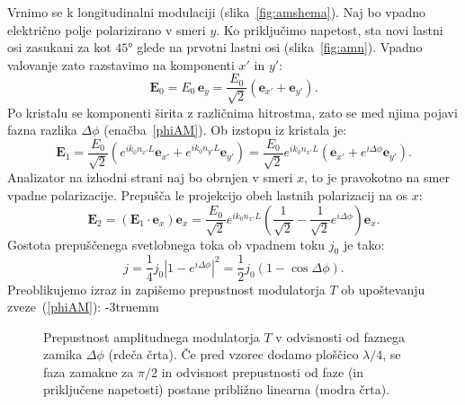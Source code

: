 Vrnimo se k longitudinalni
modulaciji (slika~\ref{fig:amshema}).
Naj bo vpadno električno polje polarizirano v smeri $y$. 
Ko priključimo napetost, sta novi lastni osi zasukani 
za kot $45\si{\degree}$ glede na prvotni lastni osi (slika~\ref{fig:amn}). Vpadno 
valovanje zato razstavimo na komponenti $x'$ in $y'$:
\begin{equation}
\mathbf{E}_0 = E_0\, \mathbf{e}_y = \frac{E_0}{\sqrt{2}}\left(\mathbf{e}_{x'} + \mathbf{e}_{y'}\right)\!\!.
\end{equation}
Po kristalu se komponenti širita z različnima hitrostma, zato se med njima pojavi 
fazna razlika $\Delta \phi$ 
(enačba~\ref{phiAM}). Ob izstopu iz kristala je:
\begin{equation}
\mathbf{E}_1 = \frac{E_0}{\sqrt{2}}\left(e^{ik_0 n_{x'}L}\mathbf{e}_{x'} + 
e^{ik_0 n_{y'}L}\mathbf{e}_{y'}\right)
= \frac{E_0}{\sqrt{2}}e^{ik_0 n_{x'}L}\left(\mathbf{e}_{x'} + 
e^{i\Delta\phi}\mathbf{e}_{y'}\right)\!\!.
\end{equation}
Analizator na izhodni strani naj bo obrnjen v smeri $x$, to je pravokotno
na smer vpadne polarizacije. Prepušča le projekcijo obeh lastnih polarizacij
na os $x$:
\begin{equation}
\mathbf{E}_2= \left(\mathbf{E}_1 \cdot \mathbf{e}_x\right)\mathbf{e}_x = 
\frac{E_0}{\sqrt{2}}e^{ik_0 n_{x'}L}
\left(\frac{1}{\sqrt{2}} -\frac{1}{\sqrt{2}} e^{i\Delta\phi}\right)\mathbf{e}_x .
\label{7.16}
\end{equation}
Gostota prepuščenega svetlobnega toka ob vpadnem toku $j_0$ je tako:
\begin{equation}
j=\frac{1}{4}j_{0}\left|1-e^{i\Delta\phi}\right|^{2}=\frac{1}{2}j_{0}(1-\cos\Delta\phi).
\label{7.17}
\end{equation}
Preoblikujemo izraz in zapišemo prepustnost modulatorja $T$ ob upoštevanju 
zveze~(\ref{phiAM}):
\vglue-3truemm
\begin{figure}[ht]
\centering
\def\svgwidth{65truemm} 

\caption{Prepustnost amplitudnega modulatorja $T$ v 
odvisnosti od faznega zamika $\Delta \phi$ (rdeča črta). 
Če pred vzorec dodamo ploščico $\lambda/4$, 
se faza zamakne za $\pi/2$ in odvisnost prepustnosti od faze (in priključene 
napetosti) postane približno linearna (modra črta).}
\label{fig:amt}
\end{figure}

